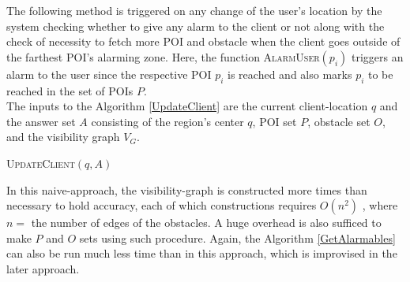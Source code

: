 The following method is triggered on any change of the user's location by the system checking whether to give any alarm to the client or not along with the check of necessity to fetch more POI and obstacle when the client goes outside of the farthest POI's alarming zone.
Here, the function \textsc{AlarmUser}$(p_i)$ triggers an alarm to the user since the respective POI $p_i$ is reached and also marks $p_i$ to be reached in the set of POIs $P$. \\
The inputs to the Algorithm \ref{UpdateClient} are the current client-location $q$ and the answer set $A$ consisting of the region's center $q$,%
POI set $P$, obstacle set $O$, and the visibility graph $V_G$.
\begin{algorithm}
\caption{\textsc{UpdateClient}$(q, A)$}

    
	  {
	}
\label{UpdateClient}
\end{algorithm}


In this naive-approach, the visibility-graph is constructed more times than necessary to hold accuracy, each of which constructions requires $O(n^2)$ \cite{mur}, where $n =$ the number of edges of the obstacles. A huge overhead is also sufficed to make $P$ and $O$ sets using such procedure. Again, the Algorithm \ref{GetAlarmables} can also be run much less time than in this approach, which is improvised in the later approach.





